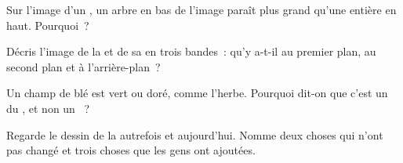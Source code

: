\begin{exercise}[$\star\star$]\label{exo:g1:landscapes-around-us:8}
Sur l'image d'un , un arbre en bas de l'image paraît plus grand
qu'une  entière en haut. Pourquoi~?
\end{exercise}

\begin{exercise}[$\star\star$]\label{exo:g1:landscapes-around-us:9}
Décris l'image de la  et de sa  en trois bandes~: qu'y a-t-il
au premier plan, au second plan et à l'arrière-plan~?
\end{exercise}

\begin{exercise}[$\star\star$]\label{exo:g1:landscapes-around-us:10}
Un champ de blé est vert ou doré, comme l'herbe. Pourquoi dit-on que c'est
un  du , et non un ~?
\end{exercise}

\begin{exercise}[$\star\star$]\label{exo:g1:landscapes-around-us:11}
Regarde le dessin de la  autrefois et aujourd'hui. Nomme deux choses
qui n'ont pas changé et trois choses que les gens ont ajoutées.
\end{exercise}
